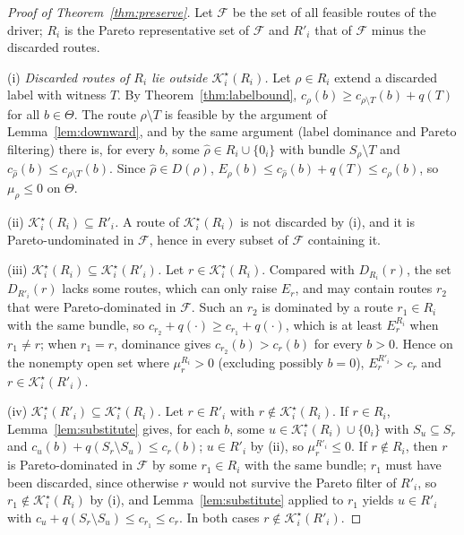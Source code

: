 \documentclass[review,12pt]{elsarticle}
\theoremstyle{definition}
\theoremstyle{remark}
\newcommand{\Kstar}{\mathcal{K}^\star}
\begin{document}
\begin{proof}[Proof of Theorem~\ref{thm:preserve}]
Let $\mathcal F$ be the set of all feasible routes of the driver; $R_i$ is
the Pareto representative set of $\mathcal F$ and $R'_i$ that of
$\mathcal F$ minus the discarded routes.

(i) \emph{Discarded routes of $R_i$ lie outside $\Kstar_i(R_i)$.} Let
$\rho\in R_i$ extend a discarded label with witness $T$. By
Theorem~\ref{thm:labelbound}, $c_\rho(b)\ge c_{\rho\setminus T}(b)+q(T)$ for all
$b\in\Theta$. The route $\rho\setminus T$ is feasible by the argument of
Lemma~\ref{lem:downward}, and by the same argument (label dominance and
Pareto filtering) there is, for every $b$, some $\hat\rho\in R_i\cup\{0_i\}$
with bundle $S_\rho\setminus T$ and $c_{\hat\rho}(b)\le c_{\rho\setminus T}(b)$.
Since $\hat\rho\in D(\rho)$, $E_\rho(b)\le c_{\hat\rho}(b)+q(T)\le c_\rho(b)$,
so $\mu_\rho\le 0$ on $\Theta$.

(ii) \emph{$\Kstar_i(R_i)\subseteq R'_i$.} A route of $\Kstar_i(R_i)$ is not
discarded by (i), and it is Pareto-undominated in $\mathcal F$, hence in
every subset of $\mathcal F$ containing it.

(iii) \emph{$\Kstar_i(R_i)\subseteq\Kstar_i(R'_i)$.} Let $r\in\Kstar_i(R_i)$.
Compared with $D_{R_i}(r)$, the set $D_{R'_i}(r)$ lacks some routes, which can
only raise $E_r$, and may contain routes $r_2$ that were Pareto-dominated in
$\mathcal F$. Such an $r_2$ is dominated by a route $r_1\in R_i$ with the
same bundle, so $c_{r_2}+q(\cdot)\ge c_{r_1}+q(\cdot)$, which is at least
$E^{R_i}_r$ when $r_1\ne r$; when $r_1=r$, dominance gives
$c_{r_2}(b)>c_r(b)$ for every $b>0$. Hence on the nonempty open set where
$\mu^{R_i}_r>0$ (excluding possibly $b=0$), $E^{R'_i}_r>c_r$ and
$r\in\Kstar_i(R'_i)$.

(iv) \emph{$\Kstar_i(R'_i)\subseteq\Kstar_i(R_i)$.} Let $r\in R'_i$ with
$r\notin\Kstar_i(R_i)$. If $r\in R_i$, Lemma~\ref{lem:substitute} gives, for
each $b$, some $u\in\Kstar_i(R_i)\cup\{0_i\}$ with $S_u\subseteq S_r$ and
$c_u(b)+q(S_r\setminus S_u)\le c_r(b)$; $u\in R'_i$ by (ii), so
$\mu^{R'_i}_r\le 0$. If $r\notin R_i$, then $r$ is Pareto-dominated in
$\mathcal F$ by some $r_1\in R_i$ with the same bundle; $r_1$ must have been
discarded, since otherwise $r$ would not survive the Pareto filter of $R'_i$,
so $r_1\notin\Kstar_i(R_i)$ by (i), and Lemma~\ref{lem:substitute} applied to
$r_1$ yields $u\in R'_i$ with $c_u+q(S_r\setminus S_u)\le c_{r_1}\le c_r$. In
both cases $r\notin\Kstar_i(R'_i)$.
\end{proof}
\end{document}
